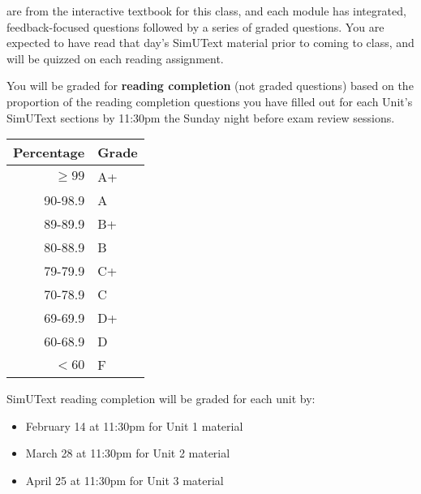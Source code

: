 \documentclass{tufte-handout}
\begin{document}
 are from the interactive textbook for this class, and each module has integrated, feedback-focused questions followed by a series of graded questions. You are expected to have read that day's SimUText material prior to coming to class, and will be quizzed on each reading assignment. 

You will be graded for \textbf{reading completion} (not graded questions) based on the proportion of the reading completion questions you have filled out for each Unit's SimUText sections by 11:30pm the Sunday night before exam review sessions.


\begin{margintable}
\begin{tabular}{rl}
Percentage & Grade \\
\hline 
$\ge99$ & A+ \\
90-98.9 & A \\
89-89.9 & B+ \\
80-88.9 & B \\
79-79.9 & C+ \\
70-78.9 & C \\
69-69.9 & D+ \\
60-68.9 & D \\
$<60$ & F \\
\hline
\end{tabular}
\end{margintable}

SimUText reading completion will be graded for each unit by:
\begin{itemize}
\item February 14 at 11:30pm for Unit 1 material
\item March 28 at 11:30pm for Unit 2 material 
\item April 25 at 11:30pm for Unit 3 material 
\end{itemize}
\end{document}
